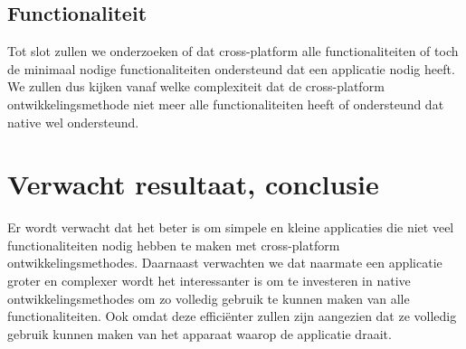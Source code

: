 \subsection{Functionaliteit}
Tot slot zullen we onderzoeken of dat cross-platform alle functionaliteiten of toch de 
minimaal nodige functionaliteiten ondersteund dat een applicatie nodig heeft. We zullen 
dus kijken vanaf welke complexiteit dat de cross-platform ontwikkelingsmethode niet meer 
alle functionaliteiten heeft of ondersteund dat native wel ondersteund.

\section{Verwacht resultaat, conclusie}%
\label{sec:verwachte_resultaten}

Er wordt verwacht dat het beter is om simpele en kleine applicaties die niet veel 
functionaliteiten nodig hebben te maken met cross-platform ontwikkelingsmethodes. 
Daarnaast verwachten we dat naarmate een applicatie groter en complexer wordt het interessanter 
is om te investeren in native ontwikkelingsmethodes om zo volledig gebruik te kunnen maken van 
alle functionaliteiten. Ook omdat deze efficiënter zullen zijn aangezien dat ze volledig gebruik 
kunnen maken van het apparaat waarop de applicatie draait.

